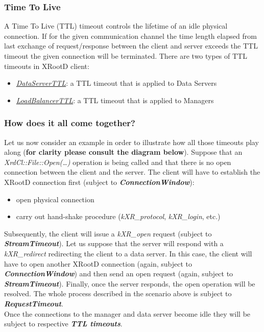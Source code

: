 \documentclass{article}
\begin{document}
		
		\subsubsection{Time To Live}
			A Time To Live (TTL) timeout controls the lifetime of an idle physical connection. If for the given communication channel the time
			length elapsed from last exchange of request/response between the client and server exceeds the TTL timeout the given connection
			will be terminated. There are two types of TTL timeouts in XRootD client:
			\begin{itemize}
			  \item \hyperref[env:dataserverttl]{\textit{DataServerTTL}}: a TTL timeout that is applied to Data Servers
			  \item \hyperref[env:loadbalancerttl]{\textit{LoadBalancerTTL}}: a TTL timeout that is applied to Managers
			\end{itemize}

			
		\subsubsection{How does it all come together?}
			Let us now consider an example in order to illustrate how all those timeouts play along (\textbf{for clarity please consult the diagram 
			below}). Suppose that an \textit{XrdCl::File::Open(\ldots)} operation is being called and that there is no open connection between the 
			client and the server. The client will have to establish the XRootD connection first (subject to \textbf{\textit{ConnectionWindow}}):
			\begin{itemize}
			  \item open physical connection
			  \item carry out hand-shake procedure (\textit{kXR_protocol}, \textit{kXR_login}, etc.)
			\end{itemize}
			Subsequently, the client will issue a \textit{kXR_open} request (subject to \textbf{\textit{StreamTimeout}}). Let us suppose 
			that the server will respond with a \textit{kXR_redirect} redirecting the client to a data server. In this case, the client will 
			have to open another XRootD connection (again, subject to \textbf{\textit{ConnectionWindow}}) and then send an open request
			(again, subject to \textbf{\textit{StreamTimeout}}). Finally, once the server responds, the open operation will be resolved. The whole
			process described in the scenario above is subject to \textbf{\textit{RequestTimeout}}. \\
			Once the connections to the manager and data server become idle they will be subject to respective \textbf{\textit{TTL timeouts}}. \\			
			
\end{document}
